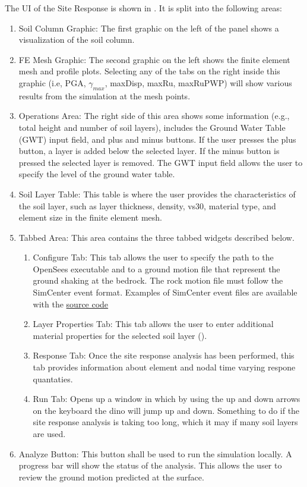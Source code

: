 The UI of the Site Response is shown in . It is split into the following areas:
\begin{enumerate}
\item Soil Column Graphic: The first graphic on the left of the panel shows a visualization of the soil column.
\item FE Mesh Graphic: The second graphic on the left shows 
the finite element mesh and profile plots. Selecting any of the tabs on the right inside this graphic (i.e, PGA, $\gamma_{max}$, maxDisp, maxRu, maxRuPWP) will show various results
from the simulation at the mesh points.
\item Operations Area: The right side of this area shows some information (e.g., total height and number of soil layers), includes the Ground Water Table (GWT) input field, and plus and minus buttons. If the user presses the plus button, a layer is added below the selected layer. If the minus button is pressed the selected layer is removed. The GWT input field allows the user to specify the level of the ground water table.
\item Soil Layer Table: This table is where the user provides the characteristics of the soil layer, such as layer thickness, density, vs30, material type, and element size in the finite element mesh.
\item Tabbed Area: This area contains the three tabbed widgets described below.

\begin{enumerate}
  \item Configure Tab: This tab allows the user to specify the path to the OpenSees executable and to a ground motion file that represent the ground shaking at the bedrock. The rock motion file must follow the SimCenter event format. Examples of SimCenter event files are available with the \href{https://github.com/NHERI-SimCenter/EE-UQ/tree/master/example1/event}{source code} 
  \item Layer Properties Tab: This tab allows the user to enter additional material properties for the selected soil layer ().
  \item Response Tab: Once the site response analysis has been performed, this tab provides information about element and nodal time varying respone quantaties.
  \item Run Tab: Opens up a window in which by using the up and down arrows on the keyboard the dino will jump up and down. Something to do if the site response analysis is taking too long, which it may if many soil layers are used.
\end{enumerate}

\item Analyze Button: This button shall be used to run the simulation locally. A progress bar will show the status of the analysis. This allows the user to review the ground motion predicted at the surface.
\end{enumerate}

